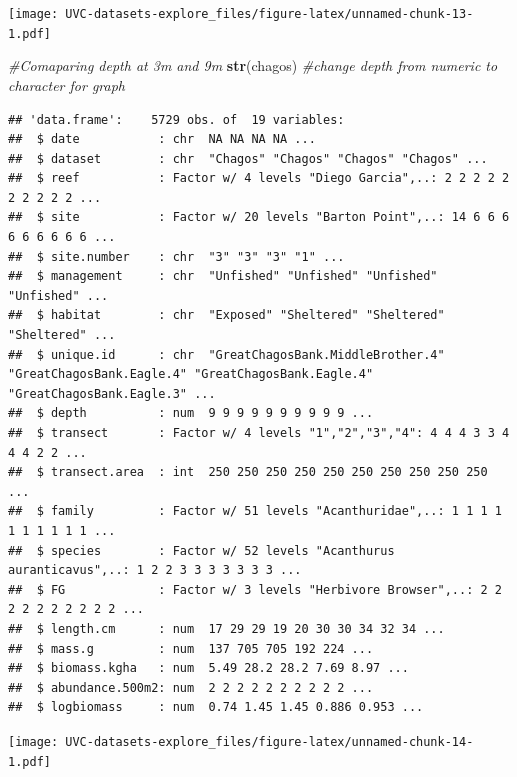 \documentclass[]{article}
\newenvironment{Shaded}{\begin{snugshade}}{\end{snugshade}}
\newcommand{\KeywordTok}[1]{\textcolor[rgb]{0.13,0.29,0.53}{\textbf{#1}}}
\newcommand{\DataTypeTok}[1]{\textcolor[rgb]{0.13,0.29,0.53}{#1}}
\newcommand{\StringTok}[1]{\textcolor[rgb]{0.31,0.60,0.02}{#1}}
\newcommand{\CommentTok}[1]{\textcolor[rgb]{0.56,0.35,0.01}{\textit{#1}}}
\newcommand{\OperatorTok}[1]{\textcolor[rgb]{0.81,0.36,0.00}{\textbf{#1}}}
\newcommand{\NormalTok}[1]{#1}
\begin{document}
\texttt{[image: UVC-datasets-explore\_files/figure-latex/unnamed-chunk-13-1.pdf]}

\begin{Shaded}
\begin{Highlighting}[]
\CommentTok{#Comaparing depth at 3m and 9m}
\KeywordTok{str}\NormalTok{(chagos) }\CommentTok{#change depth from numeric to character for graph}
\end{Highlighting}
\end{Shaded}

\begin{verbatim}
## 'data.frame':    5729 obs. of  19 variables:
##  $ date           : chr  NA NA NA NA ...
##  $ dataset        : chr  "Chagos" "Chagos" "Chagos" "Chagos" ...
##  $ reef           : Factor w/ 4 levels "Diego Garcia",..: 2 2 2 2 2 2 2 2 2 2 ...
##  $ site           : Factor w/ 20 levels "Barton Point",..: 14 6 6 6 6 6 6 6 6 6 ...
##  $ site.number    : chr  "3" "3" "3" "1" ...
##  $ management     : chr  "Unfished" "Unfished" "Unfished" "Unfished" ...
##  $ habitat        : chr  "Exposed" "Sheltered" "Sheltered" "Sheltered" ...
##  $ unique.id      : chr  "GreatChagosBank.MiddleBrother.4" "GreatChagosBank.Eagle.4" "GreatChagosBank.Eagle.4" "GreatChagosBank.Eagle.3" ...
##  $ depth          : num  9 9 9 9 9 9 9 9 9 9 ...
##  $ transect       : Factor w/ 4 levels "1","2","3","4": 4 4 4 3 3 4 4 4 2 2 ...
##  $ transect.area  : int  250 250 250 250 250 250 250 250 250 250 ...
##  $ family         : Factor w/ 51 levels "Acanthuridae",..: 1 1 1 1 1 1 1 1 1 1 ...
##  $ species        : Factor w/ 52 levels "Acanthurus auranticavus",..: 1 2 2 3 3 3 3 3 3 3 ...
##  $ FG             : Factor w/ 3 levels "Herbivore Browser",..: 2 2 2 2 2 2 2 2 2 2 ...
##  $ length.cm      : num  17 29 29 19 20 30 30 34 32 34 ...
##  $ mass.g         : num  137 705 705 192 224 ...
##  $ biomass.kgha   : num  5.49 28.2 28.2 7.69 8.97 ...
##  $ abundance.500m2: num  2 2 2 2 2 2 2 2 2 2 ...
##  $ logbiomass     : num  0.74 1.45 1.45 0.886 0.953 ...
\end{verbatim}

\begin{Shaded}
\end{Shaded}

\texttt{[image: UVC-datasets-explore\_files/figure-latex/unnamed-chunk-14-1.pdf]}
\end{document}
